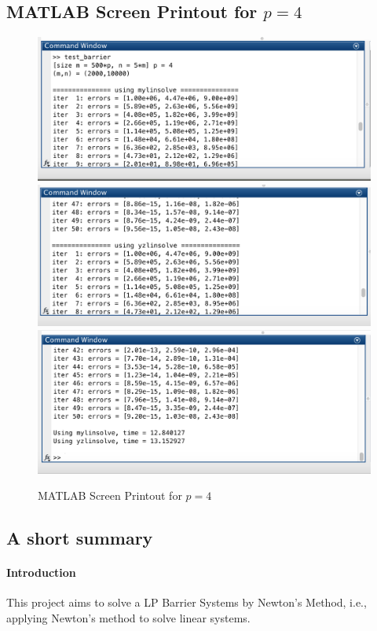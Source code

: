\subsection*{MATLAB Screen Printout for $p=4$}
\begin{figure}[H]
\centering
\includegraphics[width=16cm]{f_6}
\includegraphics[width=16cm]{f_7}
\includegraphics[width=16cm]{f_8}
\caption{MATLAB Screen Printout for $p=4$}
\end{figure}
\subsection*{A short summary}
\paragraph{Introduction}
This project aims to solve a LP Barrier Systems by Newton’s Method, i.e., applying Newton's method to solve linear systems.
